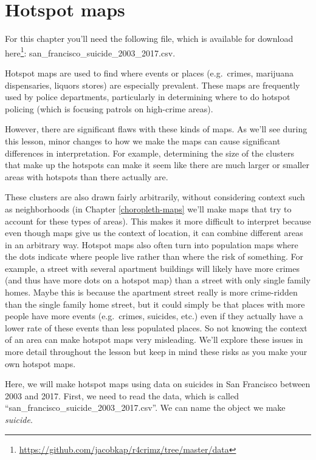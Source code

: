 \documentclass[
]{krantz}
\renewcommand{\href}[2]{#2\footnote{\url{#1}}}
\begin{document}
\hypertarget{hotspot-maps}{%
\chapter{Hotspot maps}\label{hotspot-maps}}

For this chapter you'll need the following file, which is
available for download
\href{https://github.com/jacobkap/r4crimz/tree/master/data}{here}:
san\_francisco\_suicide\_2003\_2017.csv.

Hotspot maps are used to find where events or places
(e.g.~crimes, marijuana dispensaries, liquors stores) are
especially prevalent. These maps are frequently used by
police departments, particularly in determining where to do
hotspot policing (which is focusing patrols on high-crime
areas).

However, there are significant flaws with these kinds of
maps. As we'll see during this lesson, minor changes to how
we make the maps can cause significant differences in
interpretation. For example, determining the size of the
clusters that make up the hotspots can make it seem like
there are much larger or smaller areas with hotspots than
there actually are.

These clusters are also drawn fairly arbitrarily, without
considering context such as neighborhoods (in Chapter
\ref{choropleth-maps} we'll make maps that try to account
for these types of areas). This makes it more difficult to
interpret because even though maps give us the context of
location, it can combine different areas in an arbitrary
way. Hotspot maps also often turn into population maps where
the dots indicate where people live rather than where the
risk of something. For example, a street with several
apartment buildings will likely have more crimes (and thus
have more dots on a hotspot map) than a street with only
single family homes. Maybe this is because the apartment
street really is more crime-ridden than the single family
home street, but it could simply be that places with more
people have more events (e.g.~crimes, suicides, etc.) even
if they actually have a lower rate of these events than less
populated places. So not knowing the context of an area can
make hotspot maps very misleading. We'll explore these
issues in more detail throughout the lesson but keep in mind
these risks as you make your own hotspot maps.

Here, we will make hotspot maps using data on suicides in
San Francisco between 2003 and 2017. First, we need to read
the data, which is called
``san\_francisco\_suicide\_2003\_2017.csv''. We can name the
object we make \emph{suicide}.
\end{document}
